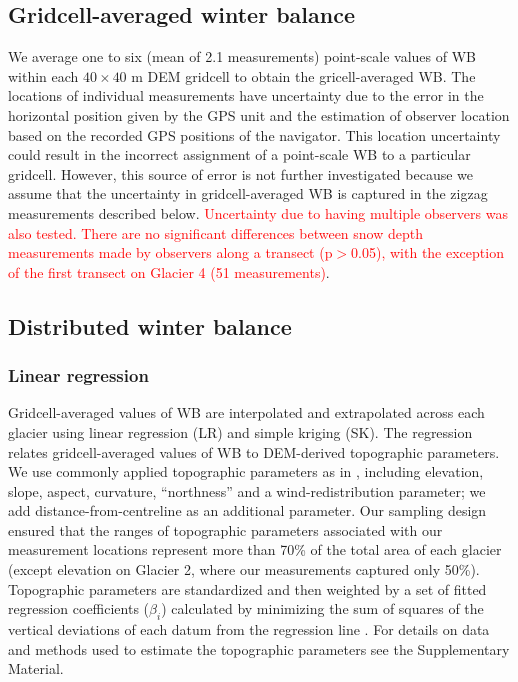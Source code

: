 \documentclass[review,oneside, letterpaper]{igs}
\begin{document}
\subsection{Gridcell-averaged winter balance}

We average one to six (mean of 2.1 measurements) point-scale values of WB within each $40 \times 40$ m DEM gridcell to obtain the gricell-averaged WB. The locations of individual measurements have  uncertainty due to the error in the horizontal position given by the GPS unit and the estimation of observer location based on the recorded GPS positions of the navigator. This location uncertainty could result in the incorrect assignment of a point-scale WB to a particular gridcell. However, this source of error is not further investigated because we assume that the uncertainty in gridcell-averaged WB is captured in the zigzag measurements described below. \textcolor{red}{Uncertainty due to having multiple observers was also tested. There are no significant differences between snow depth measurements made by observers along a transect (p$>$0.05), with the exception of the first transect on Glacier 4 (51 measurements)}. 

\subsection{Distributed winter balance}

\subsubsection{Linear regression}

Gridcell-averaged values of WB are interpolated and extrapolated across each glacier using linear regression (LR) and simple kriging (SK). The regression relates gridcell-averaged values of WB to DEM-derived topographic parameters. We use commonly applied topographic parameters as in \cite{McGrath2015}, including elevation, slope, aspect, curvature, ``northness'' and a wind-redistribution parameter; we add distance-from-centreline as an additional parameter. Our sampling design ensured that the ranges of topographic parameters associated with our measurement locations represent more than 70\% of the total area of each glacier (except elevation on Glacier 2, where our measurements captured only 50\%). Topographic parameters are standardized and then weighted by a set of fitted regression coefficients ($\beta_i$) calculated by minimizing the sum of squares of the vertical deviations of each datum from the regression line \citep{Davis1986}. For details on data and methods used to estimate the topographic parameters see the Supplementary Material. 
\end{document}
